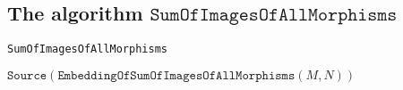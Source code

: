 \subsection{The algorithm $\mathtt{SumOfImagesOfAllMorphisms}$}

\begin{algorithm}[H]\capstart
    \caption{\texttt{SumOfImagesOfAllMorphisms}}\label{algo:SumOfImagesOfAllMorphisms}
	\BlankLine
	\Return $\mathtt{Source}( \mathtt{EmbeddingOfSumOfImagesOfAllMorphisms}( M, N ) )$\;
\end{algorithm}








